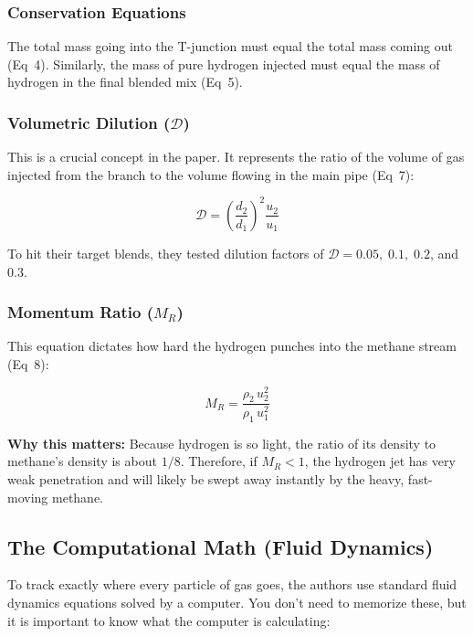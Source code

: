\documentclass[12pt,a4paper]{report}
\begin{document}
\subsubsection*{Conservation Equations}

The total mass going into the T-junction must equal the total mass coming out (Eq~4). Similarly, the mass of pure hydrogen injected must equal the mass of hydrogen in the final blended mix (Eq~5).

\subsubsection*{Volumetric Dilution ($\mathcal{D}$)}

This is a crucial concept in the paper. It represents the ratio of the volume of gas injected from the branch to the volume flowing in the main pipe (Eq~7):

\begin{equation}
  \mathcal{D} = \left(\frac{d_2}{d_1}\right)^2 \frac{u_2}{u_1}
\end{equation}

To hit their target blends, they tested dilution factors of $\mathcal{D} = 0.05,\; 0.1,\; 0.2$, and $0.3$.

\subsubsection*{Momentum Ratio ($M_R$)}

This equation dictates how hard the hydrogen punches into the methane stream (Eq~8):

\begin{equation}
  M_R = \frac{\rho_2\, u_2^2}{\rho_1\, u_1^2}
\end{equation}

\textbf{Why this matters:} Because hydrogen is so light, the ratio of its density to methane's density is about $1/8$. Therefore, if $M_R < 1$, the hydrogen jet has very weak penetration and will likely be swept away instantly by the heavy, fast-moving methane.

\subsection{The Computational Math (Fluid Dynamics)}

To track exactly where every particle of gas goes, the authors use standard fluid dynamics equations solved by a computer. You don't need to memorize these, but it is important to know what the computer is calculating:
\end{document}
